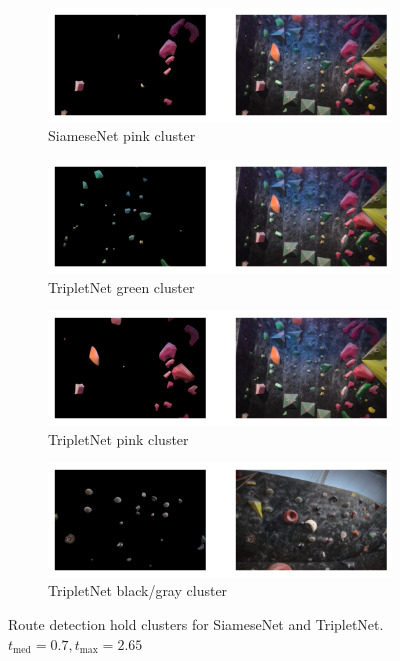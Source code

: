 \documentclass[final]{cvpr}
\begin{document}
\begin{figure}[t]
\centering
\begin{subfigure}{1\linewidth}
\centering
\includegraphics[width = \linewidth]{img/route_detection_ml/siamese_pink_cluster.png}
\caption{SiameseNet pink cluster}
\label{fig:routes_ml:a}
\end{subfigure}
\begin{subfigure}{1\linewidth}
\centering
\includegraphics[width = \linewidth]{img/route_detection_ml/triplet_green_cluster.png}
\caption{TripletNet green cluster}
\label{fig:routes_ml:b}
\end{subfigure}
\begin{subfigure}{1\linewidth}
\centering
\includegraphics[width = \linewidth]{img/route_detection_ml/triplet_pink_cluster.png}
\caption{TripletNet pink cluster}
\label{fig:routes_ml:c}
\end{subfigure}
\begin{subfigure}{1\linewidth}
\centering
\includegraphics[width = \linewidth]{img/route_detection_ml/triplet_black_cluster.png}
\caption{TripletNet black/gray cluster}
\label{fig:routes_ml:d}
\end{subfigure}
\caption{Route detection hold clusters for SiameseNet and TripletNet. $t_{\mathrm{med}} = 0.7, t_{\mathrm{max}}=2.65$}
\label{fig:routes_ml}
\end{figure}
\end{document}
